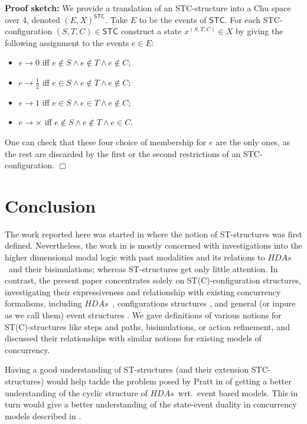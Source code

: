 \documentclass[submission,copyright,creativecommons]{eptcs}
\newenvironment{proof}[1][\!\!\,]{\vspace{1ex}\noindent\textbf{Proof #1: }}{\hfill$\Box$\vspace{2ex}}
\newcommand\executing{\ensuremath{\frac{1}{2}}}
\newcommand\HDAs{\ensuremath{\mathit{HDAs}}}
\newcommand\STC{\ensuremath{\mathsf{STC}}}
\newcommand\cancellation{\ensuremath{\times}}
\begin{document}
\begin{proof}[sketch]
We provide a translation of an STC-structure into a Chu space over 4, denoted $(E,X)^{\STC}$. Take $E$ to be the events of \STC. For each STC-configuration $(S,T,C)\in \STC$ construct a state $x^{(S,T,C)}\in X$ by giving the following assignment to the events $e\in E$:
\begin{itemize}
\item $e \rightarrow 0$ iff $e\not\in S \wedge e\not\in T \wedge e\not\in C$;
\item $e \rightarrow \executing$ iff $e\in S \wedge e\not\in T \wedge e\not\in C$;
\item $e \rightarrow 1$ iff $e\in S \wedge e\in T \wedge e\not\in C$;
\item $e \rightarrow \cancellation$ iff $e\not\in S \wedge e\not\in T \wedge e\in C$.
\end{itemize}
One can check that these four choice of membership for $e$ are the only ones, as the rest are discarded by the first or the second restrictions of an STC-configuration.
\end{proof}




\section{Conclusion}\label{sec_conclusion}

The work reported here was started in \cite{P12turing} where the notion of ST-structures was first defined. Nevertheless, the work in \cite{P12turing} is mostly concerned with investigations into the higher dimensional modal logic with past modalities and its relations to \HDAs\ and their bisimulations; whereas ST-structures get only little attention. In contrast, the present paper concentrates solely on ST(C)-configuration structures, investigating their expressiveness and relationship with existing concurrency formalisms, including \HDAs\ \cite{pratt91hda,Glabbeek06HDA}, configurations structures \cite{GlabbeekP95config,GlabbeekG01refinement}, and general (or inpure as we call them) event structures \cite{GlabbeekP09configStruct}. We gave definitions of various notions for ST(C)-structures like steps and paths, bisimulations, or action refinement, and discussed their relationships with similar notions for existing models of concurrency.

Having a good understanding of ST-structures (and their extension STC-structures) would help tackle the problem posed by Pratt in \cite{Pratt00HDArev} of getting a better understanding of the cyclic structure of \HDAs\ wrt.\ event based models. This in turn would give a better understanding of the state-event duality in concurrency models described in \cite{Pratt02duality,Pratt03trans_cancel}.
\end{document}
